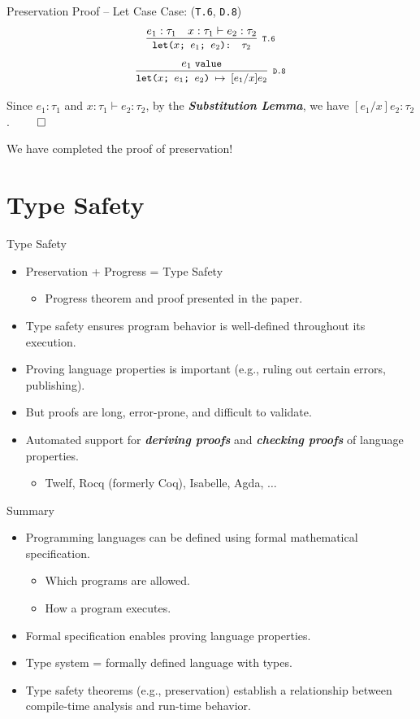 \documentclass{beamer}
\renewcommand{\emph}[1]{\textbf{\textit{#1}}}
\begin{document}
\begin{frame}{Preservation Proof -- Let Case}
Case: (\texttt{T.6}, \texttt{D.8})
\[
\cinfer[T.6]{let($x$; $e_1$; $e_2$): $\tau_2$}
  {e_1: \tau_1
   &
   x : \tau_1 \vdash e_2: \tau_2
  }
\]
\[
\cinfer[D.8]{let($x$; $e_1$; $e_2$) $\stepto$ $[e_1 / x]e_2$}{e_1 \; \code{value}}
\]

Since $e_1: \tau_1$ and $x : \tau_1 \vdash e_2: \tau_2$,
by the \emph{Substitution Lemma}, we have $[e_1 / x]e_2 : \tau_2$.
$\qed$

We have completed the proof of preservation!
\end{frame}


\section{Type Safety}

\begin{frame}{Type Safety}
\begin{itemize}
\item Preservation + Progress = Type Safety
  \begin{itemize}
  \item Progress theorem and proof presented in the paper.
  \end{itemize}

\pause
\item Type safety ensures program behavior is well-defined
throughout its execution.

\pause
\item Proving language properties is important
(e.g., ruling out certain errors, publishing).

\pause
\item But proofs are long, error-prone, and difficult
to validate.

\item Automated support for \emph{deriving proofs} and
\emph{checking proofs} of language properties.
	\begin{itemize}
	\item Twelf, Rocq (formerly Coq), Isabelle, Agda, $\ldots$
	\end{itemize}
\end{itemize}
\end{frame}


\begin{frame}{Summary}
\begin{itemize}
\item Programming languages can be defined using formal
mathematical specification.
	\begin{itemize}
	\item Which programs are allowed.
	\item How a program executes.
	\end{itemize}
\item Formal specification enables proving language properties.
\item Type system = formally defined language with types.
\item Type safety theorems (e.g., preservation) establish
a relationship between compile-time analysis and run-time
behavior.
\end{itemize}
\end{frame}
\end{document}
